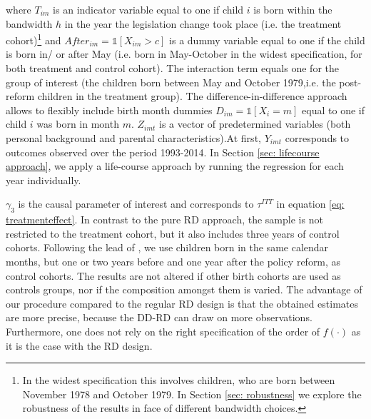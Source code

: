 \documentclass[a4paper ]{article}
\begin{document}
where $T_{im}$ is an indicator variable equal to one if child $i$ is born within the bandwidth $h$ in the year the legislation change took place (i.e. the treatment cohort)\footnote{In the widest specification this involves children, who are born between November 1978 and October 1979. In Section \ref{sec: robustness} we explore the robustness of the results in face of different bandwidth choices.} and $After_{im}=\mathds{1}[X_{im}>c]$ is a dummy variable equal to one if the child is born in/ or after May (i.e. born in May-October in the widest specification, for both treatment and control cohort). The interaction term equals one for the group of interest (the children born between May and October 1979,i.e. the post-reform children in the treatment group). The difference-in-difference approach allows to flexibly include birth month dummies $D_{im}=\mathds{1}[X_i=m]$ equal to one if child $i$ was born in month $m$. $Z_{imt}$ is a vector of predetermined variables (both personal background and parental characteristics).\newline At first, $Y_{imt}$ corresponds to outcomes observed over the period 1993-2014. In Section \ref{sec: lifecourse approach}, we apply a life-course approach by running the regression for each year individually. 

$\gamma_3$ is the causal parameter of interest and corresponds to $\tau^{ITT}$ in equation \ref{eq: treatmenteffect}.\newline 
In contrast to the pure RD approach, the sample is not restricted to the treatment cohort, but it also includes  three years of control cohorts. Following the lead of \cite{dustmann2012expansions}, we use children born in the same calendar months, but one or two years before and one year after the policy reform, as control cohorts. The results are not altered if other birth cohorts are used as controls groups, nor if the composition amongst them is varied. The advantage of our procedure compared to the regular RD design is that the obtained estimates are more precise, because the DD-RD can draw on more observations. Furthermore, one does not rely on the right specification of  the order of $f(\cdot)$ as it is the case with the RD design.











\bigskip
\end{document}
